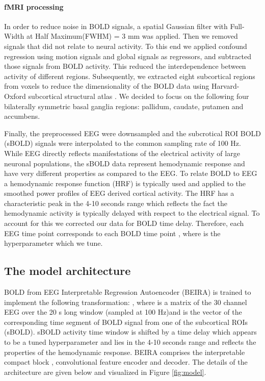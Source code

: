 \documentclass{article}
\begin{document}
\paragraph{fMRI processing} 
In order to reduce noise in BOLD signals, a spatial Gaussian filter  with Full-Width at Half Maximum(FWHM) = 3 mm was applied. Then we removed signals that did not relate to neural activity. To this end we applied confound regression using motion signals and global signals as regressors, and subtracted those signals from BOLD activity. This reduced the interdependence between activity of different regions. Subsequently, we extracted eight subcortical regions from voxels to reduce the dimensionality of the BOLD data using Harvard-Oxford subcortical structural atlas \cite{oxford_atlas}.  We decided to focus on the following four bilaterally symmetric basal ganglia regions: pallidum, caudate, putamen and accumbens.

Finally, the preprocessed EEG were downsampled and the subcrotical ROI BOLD (sBOLD) signals were interpolated to the common sampling rate of 100 Hz. While EEG directly reflects manifestations of the electrical activity of large neuronal populations, the sBOLD data represent hemodynamic response and have very different properties as compared to the EEG. To relate BOLD to EEG a hemodynamic response function (HRF) \cite{hrf_bold} is typically used and applied to the smoothed power profiles of EEG derived cortical activity. The HRF has a characteristic peak in the 4-10 seconds range which reflects the fact the hemodynamic activity is typically delayed with respect to the electrical signal. To account for this we corrected our data for BOLD time delay. Therefore, each EEG time point  corresponds to each BOLD time point , where  is the hyperparameter which we tune. 


\subsection{The model architecture}

BOLD from EEG Interpretable Regression Autoencoder (BEIRA) is trained to implement the following transformation: , where  is a  matrix of the 30 channel EEG over the 20 s long window (sampled at 100 Hz)and  is the vector of the corresponding time segment of BOLD signal from one of the subcortical ROIs (sBOLD). sBOLD activity time window is shifted by a time delay which appears to be a tuned hyperparameter and lies in the 4-10 seconds range and reflects the properties of the hemodynamic response. BEIRA comprises the interpretable compact block  \cite{petrosyan2021decoding}, convolutional feature encoder and decoder. The details of the architecture are given below and visualized in Figure \ref{fig:model}.
\end{document}
